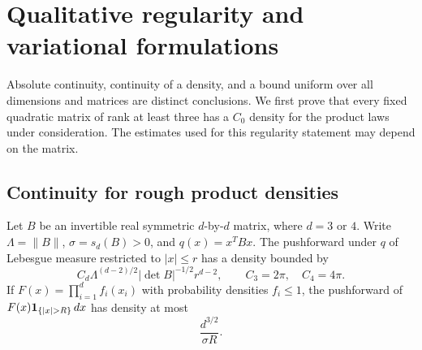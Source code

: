 \section{Qualitative regularity and variational formulations}
\label{sec:regularity-normal-forms}

Absolute continuity, continuity of a density, and a bound uniform over
all dimensions and matrices are distinct conclusions.  We first prove
that every fixed quadratic matrix of rank at least three has a $C_0$
density for the product laws under consideration.  The estimates used
for this regularity statement may depend on the matrix.

\subsection{Continuity for rough product densities}

\begin{lemma}
\label{fg:critical-ball}
Let $B$ be an invertible real symmetric $d$-by-$d$ matrix,
where $d=3$ or $4$.  Write
$\Lambda=\|B\|$, $\sigma=s_d(B)>0$, and
$q(x)=x^TBx$.  The pushforward under $q$ of Lebesgue measure
restricted to $|x|\leq r$ has a density bounded by
\begin{equation}\label{fg:critical-bound}
 C_d\Lambda^{(d-2)/2}|\det B|^{-1/2}r^{d-2},
 \qquad C_3=2\pi,\quad C_4=4\pi.
\end{equation}
If $F(x)=\prod_{i=1}^d f_i(x_i)$ with probability densities
$f_i\leq1$, the pushforward of
$F(x){\bf1}_{\{|x|>R\}}\,dx$ has density at most
\begin{equation}\label{fg:far-bound}
 \frac{d^{3/2}}{\sigma R}.
\end{equation}
\end{lemma}

